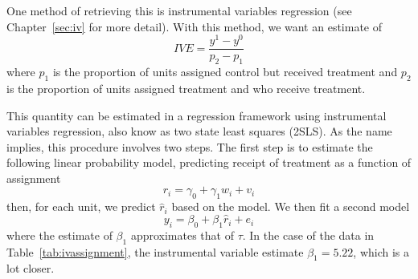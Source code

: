 One method of retrieving this is instrumental variables regression (see Chapter~\ref{sec:iv} for more detail). With this method, we want an estimate of
\begin{equation}
IVE=\frac{y^1-y^0}{p_2-p_1}
\end{equation}
where $p_1$ is the proportion of units assigned control but received treatment and $p_2$ is the proportion of units assigned treatment and who receive treatment.

This quantity can be estimated in a regression framework using instrumental variables regression, also know as two state least squares (2SLS). As the name implies, this procedure involves two steps. The first step is to estimate the following linear probability model, predicting receipt of treatment as a function of assignment
\begin{equation}
r_i=\gamma_0+\gamma_1w_i+v_i
\end{equation}
then, for each unit, we predict $\hat{r}_i$ based on the model. We then fit a second model
\begin{equation}
y_i=\beta_0+\beta_1\hat{r}_i+e_i
\end{equation}
where the estimate of $\beta_1$ approximates that of $\tau$. In the case of the data in Table~\ref{tab:ivassignment}, the instrumental variable estimate $\beta_1 = 5.22$, which is a lot closer.

